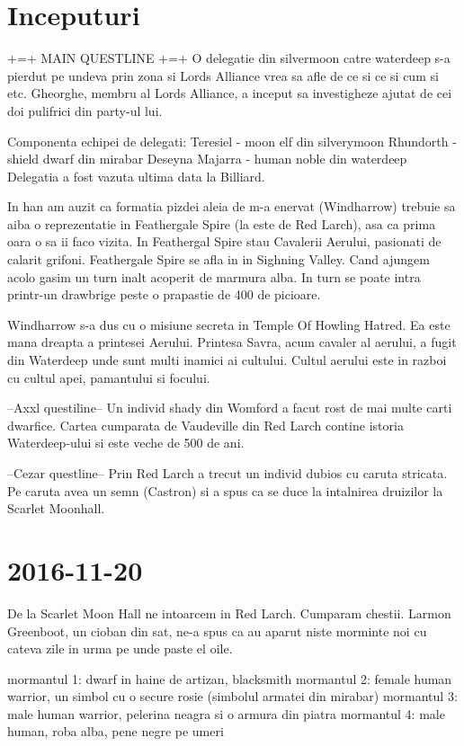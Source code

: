 \documentclass[12pt,twoside]{book}
\begin{document}
\section{Inceputuri}
+=+ MAIN QUESTLINE +=+
O delegatie din silvermoon catre waterdeep s-a pierdut pe undeva prin zona si Lords Alliance vrea sa afle de ce si ce si cum si etc. 
Gheorghe, membru al Lords Alliance, a inceput sa investigheze ajutat de cei doi pulifrici din party-ul lui.


Componenta echipei de delegati:
Teresiel - moon elf din silverymoon
Rhundorth - shield dwarf din mirabar
Deseyna Majarra - human noble din waterdeep
Delegatia a fost vazuta ultima data la Billiard.


In han am auzit ca formatia pizdei aleia de m-a enervat (Windharrow) trebuie sa aiba o reprezentatie in Feathergale Spire (la este de Red Larch), asa ca prima oara o sa ii faco vizita. In Feathergal Spire stau
Cavalerii Aerului, pasionati de calarit grifoni. Feathergale Spire se afla in in Sighning Valley.
Cand ajungem acolo gasim un turn inalt acoperit de marmura alba. In turn se poate intra
printr-un drawbrige peste o prapastie de 400 de picioare.


Windharrow s-a dus cu o misiune secreta in Temple Of Howling Hatred. Ea este mana dreapta
a printesei Aerului. Printesa Savra, acum cavaler al aerului, a fugit din Waterdeep unde sunt multi inamici ai
cultului.
Cultul aerului este in razboi cu cultul apei, pamantului si focului.


--Axxl questiline--
Un individ shady din Womford a facut rost de mai multe carti dwarfice. Cartea
cumparata de Vaudeville din Red Larch contine istoria Waterdeep-ului si este veche 
de 500 de ani.


--Cezar questline--
Prin Red Larch a trecut un individ dubios cu caruta stricata. Pe caruta avea 
un semn (Castron) si a spus ca se duce la intalnirea druizilor la Scarlet Moonhall.

\section{2016-11-20}

De la Scarlet Moon Hall ne intoarcem in Red Larch. Cumparam
chestii. Larmon Greenboot, un cioban din sat, ne-a spus ca au aparut niste 
morminte noi cu cateva zile in urma pe unde paste el oile.

mormantul 1: dwarf in haine de artizan, blacksmith
mormantul 2: female human warrior, un simbol cu o 
	     secure rosie (simbolul armatei din mirabar)
mormantul 3: male human warrior, pelerina neagra si o armura din piatra
mormantul 4: male human, roba alba, pene negre pe umeri
\end{document}
